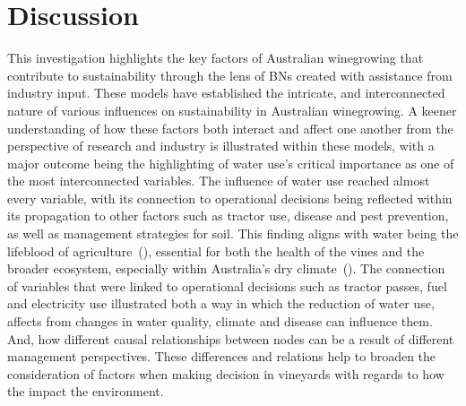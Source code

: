 \documentclass[fleqn,10pt]{wlscirep}
\begin{document}




\section*{Discussion}
This investigation highlights the key factors of Australian winegrowing that contribute to sustainability through the lens of BNs created with assistance from industry input. These models have established the intricate, and interconnected nature of various influences on sustainability in Australian winegrowing. A keener understanding of how these factors both interact and affect one another from the perspective of research and industry is illustrated within these models, with a major outcome being the highlighting of water use's critical importance as one of the most interconnected variables. The influence of water use reached almost every variable, with its connection to operational decisions being reflected within its propagation to other factors such as tractor use, disease and pest prevention, as well as management strategies for soil. This finding aligns with water being the lifeblood of agriculture~(\cite{chawlaWaterProductivityAgriculture2023}), essential for both the health of the vines and the broader ecosystem, especially within Australia's dry climate~(\cite{australianbureauofstatisticsWaterUseAustralian2021}). The connection of variables that were linked to operational decisions such as tractor passes, fuel and electricity use illustrated both a way in which the reduction of water use, affects from changes in water quality, climate and disease can influence them. And, how different causal relationships between nodes can be a result of different management perspectives. These differences and relations help to broaden the consideration of factors when making decision in vineyards with regards to how the impact the environment.
\end{document}
